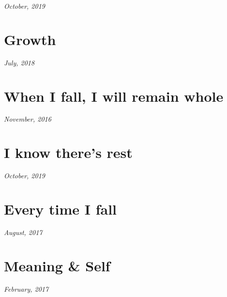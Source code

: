 \documentclass[11pt]{memoir}
\begin{document}
    \hfill\textit{October, 2019}

    


    \section*{Growth}

    \hfill\textit{July, 2018}

    
    \newpage


    \section*{When I fall, I will remain whole}

    \hfill\textit{November, 2016}

    
    \newpage


    \section*{I know there's rest}

    \hfill\textit{October, 2019}

    
    \newpage


    \section*{Every time I fall}

    \hfill\textit{August, 2017}

    
    \newpage


    \section*{Meaning \& Self}

    \hfill\textit{February, 2017}

    

  \backmatter
\end{document}
